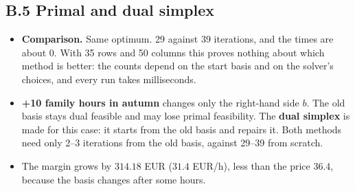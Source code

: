 \subsection*{B.5 \quad Primal and dual simplex}



\begin{itemize}
\item \textbf{Comparison.} Same optimum. 29 against 39 iterations, and the times are about 0. With 35 rows and 50 columns this proves nothing about which method is better: the counts depend on the start basis and on the solver's choices, and every run takes milliseconds.
\item \textbf{+10 family hours in autumn} changes only the right-hand side $b$. The old basis stays dual feasible and may lose primal feasibility. The \textbf{dual simplex} is made for this case: it starts from the old basis and repairs it. Both methods need only 2--3 iterations from the old basis, against 29--39 from scratch.
\item The margin grows by $314.18$ EUR ($31.4$ EUR/h), less than the price $36.4$, because the basis changes after some hours.
\end{itemize}
